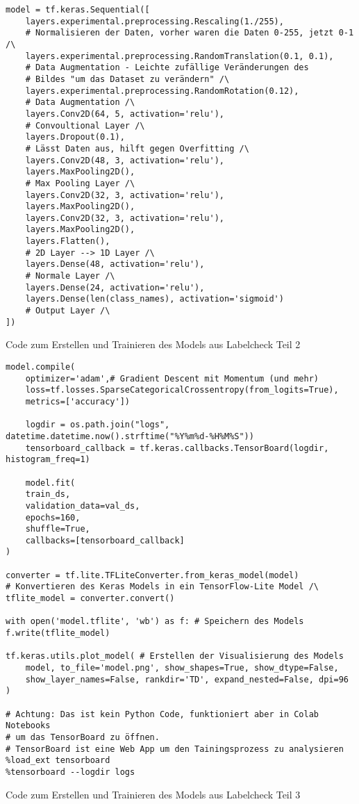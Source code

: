 \begin{listing}[H]
    \begin{verbatim}
model = tf.keras.Sequential([
    layers.experimental.preprocessing.Rescaling(1./255),
    # Normalisieren der Daten, vorher waren die Daten 0-255, jetzt 0-1 /\
    layers.experimental.preprocessing.RandomTranslation(0.1, 0.1),
    # Data Augmentation - Leichte zufällige Veränderungen des
    # Bildes "um das Dataset zu verändern" /\
    layers.experimental.preprocessing.RandomRotation(0.12),
    # Data Augmentation /\
    layers.Conv2D(64, 5, activation='relu'),
    # Convoultional Layer /\
    layers.Dropout(0.1),
    # Lässt Daten aus, hilft gegen Overfitting /\
    layers.Conv2D(48, 3, activation='relu'),
    layers.MaxPooling2D(),
    # Max Pooling Layer /\
    layers.Conv2D(32, 3, activation='relu'),
    layers.MaxPooling2D(),
    layers.Conv2D(32, 3, activation='relu'),
    layers.MaxPooling2D(),
    layers.Flatten(),
    # 2D Layer --> 1D Layer /\
    layers.Dense(48, activation='relu'),
    # Normale Layer /\
    layers.Dense(24, activation='relu'),
    layers.Dense(len(class_names), activation='sigmoid')
    # Output Layer /\
])
    \end{verbatim}
    \caption{Code zum Erstellen und Trainieren des Models aus Labelcheck Teil 2}\label{teil2}
\end{listing}

\begin{listing}[H]
    \begin{verbatim}
model.compile(
    optimizer='adam',# Gradient Descent mit Momentum (und mehr)
    loss=tf.losses.SparseCategoricalCrossentropy(from_logits=True),
    metrics=['accuracy'])
    
    logdir = os.path.join("logs", datetime.datetime.now().strftime("%Y%m%d-%H%M%S"))
    tensorboard_callback = tf.keras.callbacks.TensorBoard(logdir, histogram_freq=1)
    
    model.fit(
    train_ds,
    validation_data=val_ds,
    epochs=160,
    shuffle=True,
    callbacks=[tensorboard_callback]
)
    
converter = tf.lite.TFLiteConverter.from_keras_model(model)
# Konvertieren des Keras Models in ein TensorFlow-Lite Model /\
tflite_model = converter.convert()

with open('model.tflite', 'wb') as f: # Speichern des Models
f.write(tflite_model)

tf.keras.utils.plot_model( # Erstellen der Visualisierung des Models
    model, to_file='model.png', show_shapes=True, show_dtype=False,
    show_layer_names=False, rankdir='TD', expand_nested=False, dpi=96
)

# Achtung: Das ist kein Python Code, funktioniert aber in Colab Notebooks
# um das TensorBoard zu öffnen.
# TensorBoard ist eine Web App um den Tainingsprozess zu analysieren
%load_ext tensorboard
%tensorboard --logdir logs
    \end{verbatim}
    \caption{Code zum Erstellen und Trainieren des Models aus Labelcheck Teil 3}
\end{listing}

